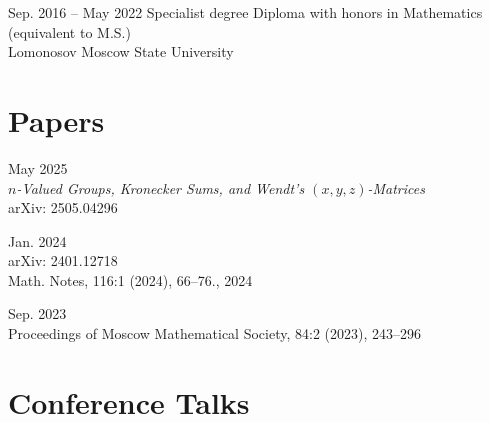 \documentclass[11pt,letterpaper]{report}
\begin{document}
    \begin{tablist}

        \item[Sep. 2016 -- May 2022]  \tab{}Specialist degree Diploma with honors in Mathematics (equivalent to M.S.)\\ Lomonosov Moscow State University 

    \end{tablist}
    
    
    
    
    
    
      \section*{Papers}

    \begin{tablist}
	
	\item[May 2025] \\ {\it $n$-Valued Groups, Kronecker Sums, and Wendt's $(x, y, z)$-Matrices}\\ arXiv: 2505.04296
        \item[Jan. 2024] \\ arXiv: 2401.12718\\ Math. Notes, 116:1 (2024), 66–76., 2024
        \item[Sep. 2023] \\ Proceedings of Moscow Mathematical Society, 84:2 (2023),  243–296
        
    \end{tablist}
    
    
        
    
    
    
    
    
     \section*{Conference Talks}
\end{document}
